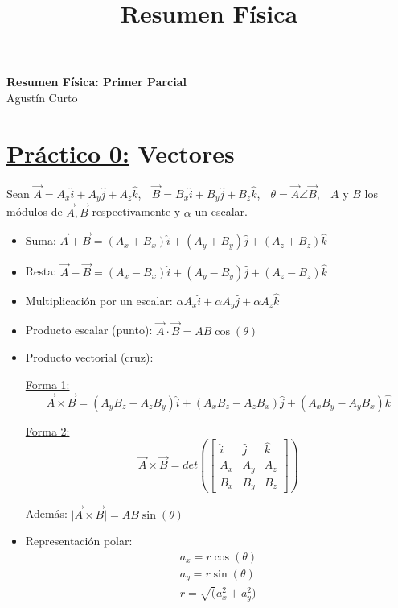 \documentclass[11pt,a4paper]{article}
\title{Resumen Física}
\providecommand{\abs}[1]{\lvert#1\rvert}
\newcommand{\PN}{\par\noindent}
\begin{document}
	\begin{center}
		\Huge \textbf{Resumen Física: Primer Parcial} \\
		\large Agustín Curto
	\end{center}

	\section*{\underline{Práctico 0:} Vectores}
		\PN Sean $\vec{A} = A_{x} \hat{i} + A_{y} \hat{j} + A_{z} \hat{k}$, $\;$ $\vec{B} = B_{x} \hat{i} + B_{y} \hat{j} +
			B_{z} \hat{k}$, $\;$ $\theta = \vec{A} \angle \vec{B}$, $\;$ $A$ y $B$ los módulos de $\vec{A}, \vec{B}$
			respectivamente y $\alpha$ un escalar.
		\begin{multicols}{2}
			\begin{itemize}
				\item Suma: $\vec{A} + \vec{B} = (A_{x} + B_{x}) \hat{i} + (A_{y} + B_{y}) \hat{j} + (A_{z} + B_{z}) \hat{k}$
				\item Resta: $\vec{A} - \vec{B} = (A_{x} - B_{x}) \hat{i} + (A_{y} - B_{y}) \hat{j} + (A_{z} - B_{z}) \hat{k}$
				\item Multiplicación por un escalar: $\alpha A_{x} \hat{i} + \alpha A_{y} \hat{j} + \alpha A_{z} \hat{k}$
				\item Producto escalar (punto): $\vec{A} \cdot \vec{B} = AB \cos(\theta)$
				\item Producto vectorial (cruz):
					\PN \underline{Forma 1:}
					\[
						\vec{A} \times \vec{B} = (A_{y}B_{z} - A_{z}B_{y}) \hat{i} + (A_{x}B_{z} - A_{z}B_{x}) \hat{j} +
						(A_{x}B_{y} - A_{y}B_{x}) \hat{k}
					\]

					\PN \underline{Forma 2:}
						\[
							\vec{A} \times \vec{B} = det
								\left(
								  \begin{bmatrix}
								    \hat{i} & \hat{j} & \hat{k} \\
								    A_{x} & A_{y} & A_{z} \\
								    B_{x} & B_{y} & B_{z}
								  \end{bmatrix}
								\right)
						\]
					\PN Además: $\abs{\vec{A} \times \vec{B}} = AB \sin(\theta)$
				\item Representación polar:
					\begin{eqnarray*}
						a_{x} = r \cos(\theta) \\
						a_{y} = r \sin(\theta) \\
						r = \sqrt(a_{x}^{2} + a_{y}^{2})
					\end{eqnarray*}
			\end{itemize}
		\end{multicols}
\end{document}
